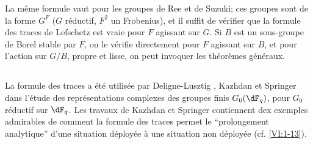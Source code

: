 La m\^eme formule vaut pour les groupes de Ree et de Suzuki; ces groupes sont 
de la forme $G^F$ ($G$ r\'eductif, $F^2$ un Frobenius), et il suffit de 
v\'erifier que la formule des traces de Lefschetz est vraie pour $F$ agissant 
sur $G$. Si $B$ est un sous-groupe de Borel stable par $F$, on le v\'erifie 
directement pour $F$ agissant sur $B$, et pour l'action sur $G/B$, propre et 
lisse, on peut invoquer les th\'eor\`emes g\'en\'eraux. 





\subsection{}\label{VI:8-3}

La formule des traces a \'et\'e utilis\'ee par Deligne-Lusztig \cite{dl76}, 
Kazhdan \cite{ka77} et Springer \cite{sp76} dans l'\'etude des 
repr\'esentations complexes des groupes finis $G_0(\dF_q)$, pour $G_0$ 
r\'eductif sur $\dF_q$. Les travaux de Kazhdan et Springer contiennent dex 
exemples admirables de comment la formule des traces permet le ``prolongement 
analytique'' d'une situation d\'eploy\'ee \`a une situation non d\'eploy\'ee 
(cf. \ref{VI:1-13}). 






